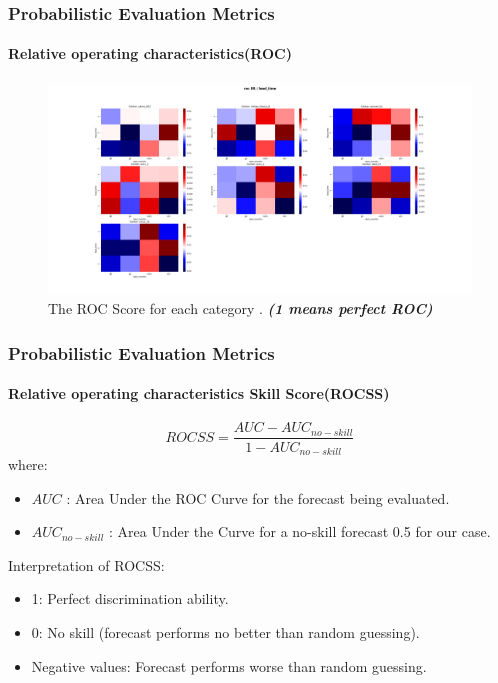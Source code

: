\begin{frame}
\frametitle{Probabilistic Evaluation Metrics}
\framesubtitle{Relative operating characteristics(ROC)}

\begin{figure}[H]
    \centering
    \includegraphics[scale=0.15]{roc_RR_lead_time.png}
    \caption{The ROC Score for each category  . \textbf{\textit{(1 means perfect ROC)}}}
\end{figure}
\end{frame}


\begin{frame}

\frametitle{Probabilistic Evaluation Metrics}
\framesubtitle{Relative operating characteristics Skill Score(ROCSS)}
	$$ROCSS=\frac{AUC-AUC_{no-skill}}{1-AUC_{no-skill}}$$
where:
\begin{itemize}
	\item $AUC$ : Area Under the ROC Curve for the forecast being evaluated.
	\item $AUC_{no-skill}$ : Area Under the Curve for a no-skill forecast 0.5 for our case.
\end{itemize}

Interpretation of ROCSS:
\begin{itemize}
	\item 1: Perfect discrimination ability.
	\item 0: No skill (forecast performs no better than random guessing).
	\item Negative values: Forecast performs worse than random guessing.
\end{itemize}
\end{frame}


